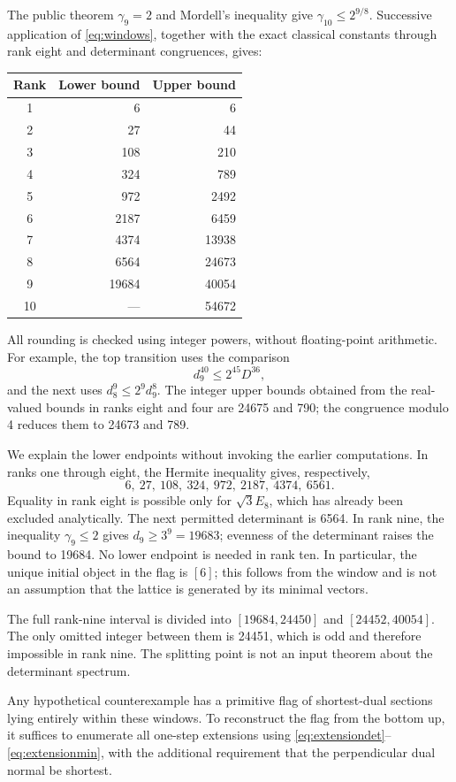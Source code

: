 \documentclass[11pt,a4paper]{article}
\theoremstyle{remark}\newtheorem{remark}[theorem]{Remark}
\begin{document}
The public theorem $\gamma_9=2$ and Mordell's inequality give $\gamma_{10}\le2^{9/8}$. Successive application of \eqref{eq:windows}, together with the exact classical constants through rank eight and determinant congruences, gives:
\begin{center}
\begin{tabular}{crr}
\toprule
Rank & Lower bound & Upper bound\\\midrule
1&6&6\\
2&27&44\\
3&108&210\\
4&324&789\\
5&972&2492\\
6&2187&6459\\
7&4374&13938\\
8&6564&24673\\
9&19684&40054\\
10&---&54672\\
\bottomrule
\end{tabular}
\end{center}
All rounding is checked using integer powers, without floating-point arithmetic. For example, the top transition uses the comparison
\[
d_9^{40}\le2^{45}D^{36},
\]
and the next uses $d_8^9\le2^9d_9^8$. The integer upper bounds obtained from the real-valued bounds in ranks eight and four are 24675 and 790; the congruence modulo 4 reduces them to 24673 and 789.

We explain the lower endpoints without invoking the earlier computations. In ranks one through eight, the Hermite inequality gives, respectively,
\[
6,\ 27,\ 108,\ 324,\ 972,\ 2187,\ 4374,\ 6561.
\]
Equality in rank eight is possible only for $\sqrt3E_8$, which has already been excluded analytically. The next permitted determinant is 6564. In rank nine, the inequality $\gamma_9\le2$ gives $d_9\ge3^9=19683$; evenness of the determinant raises the bound to 19684. No lower endpoint is needed in rank ten. In particular, the unique initial object in the flag is $[6]$; this follows from the window and is not an assumption that the lattice is generated by its minimal vectors.

The full rank-nine interval is divided into $[19684,24450]$ and $[24452,40054]$. The only omitted integer between them is 24451, which is odd and therefore impossible in rank nine. The splitting point is not an input theorem about the determinant spectrum.

Any hypothetical counterexample has a primitive flag of shortest-dual sections lying entirely within these windows. To reconstruct the flag from the bottom up, it suffices to enumerate all one-step extensions using \eqref{eq:extensiondet}--\eqref{eq:extensionmin}, with the additional requirement that the perpendicular dual normal be shortest.
\end{document}
